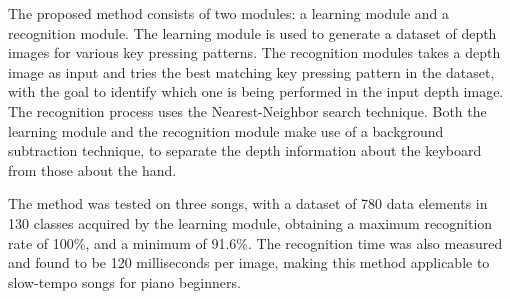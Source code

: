 The proposed method consists of two modules: a learning module and a recognition module.
The learning module is used to generate a dataset of depth images for various key pressing patterns.
The recognition modules takes a depth image as input and tries the best matching key pressing pattern in the dataset,
with the goal to identify which one is being performed in the input depth image.
The recognition process uses the Nearest-Neighbor search technique.
Both the learning module and the recognition module make use of a background subtraction technique,
to separate the depth information about the keyboard from those about the hand.

The method was tested on three songs, with a dataset of 780 data elements in 130 classes acquired
by the learning module, obtaining a maximum recognition rate of 100\%, and a minimum of 91.6\%.
The recognition time was also measured and found to be 120 milliseconds per image,
making this method applicable to slow-tempo songs for piano beginners.

